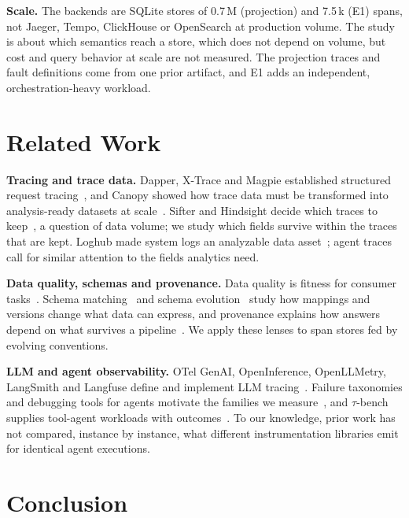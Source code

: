 \documentclass[conference]{IEEEtran}
\begin{document}
\textbf{Scale.} The backends are SQLite stores of 0.7\,M (projection)
and 7.5\,k (E1) spans, not Jaeger, Tempo, ClickHouse or OpenSearch at
production volume. The study is about which semantics reach a store,
which does not depend on volume, but cost and query behavior at scale
are not measured. The projection traces and fault definitions come from
one prior artifact, and E1 adds an independent, orchestration-heavy
workload.

\section{Related Work}
\label{sec:related}

\textbf{Tracing and trace data.} Dapper, X-Trace and Magpie established
structured request tracing~\cite{dapper,xtrace,magpie}, and Canopy
showed how trace data must be transformed into analysis-ready datasets
at scale~\cite{canopy}. Sifter and Hindsight decide which traces to
keep~\cite{sifter,hindsight}, a question of data volume; we study which
fields survive within the traces that are kept. Loghub made system logs
an analyzable data asset~\cite{loghub}; agent traces call for similar
attention to the fields analytics need.

\textbf{Data quality, schemas and provenance.} Data quality is fitness
for consumer tasks~\cite{wang_strong,batini}. Schema
matching~\cite{rahm_bernstein} and schema evolution~\cite{prism} study
how mappings and versions change what data can express, and provenance
explains how answers depend on what survives a
pipeline~\cite{cheney_provenance}. We apply these lenses to span stores
fed by evolving conventions.

\textbf{LLM and agent observability.} OTel GenAI, OpenInference,
OpenLLMetry, LangSmith and Langfuse define and implement LLM
tracing~\cite{otel_genai,otel_agent_spans,openinference,openllmetry,langsmith,langfuse}.
Failure taxonomies and debugging tools for agents motivate the families
we
measure~\cite{mast,agentops,agdebugger,agenttelemetry_aiware}, and
$\tau$-bench supplies tool-agent workloads with outcomes~\cite{taubench}.
To our knowledge, prior work has not compared, instance by instance,
what different instrumentation libraries emit for identical agent
executions.

\section{Conclusion}
\label{sec:conclusion}
\end{document}
